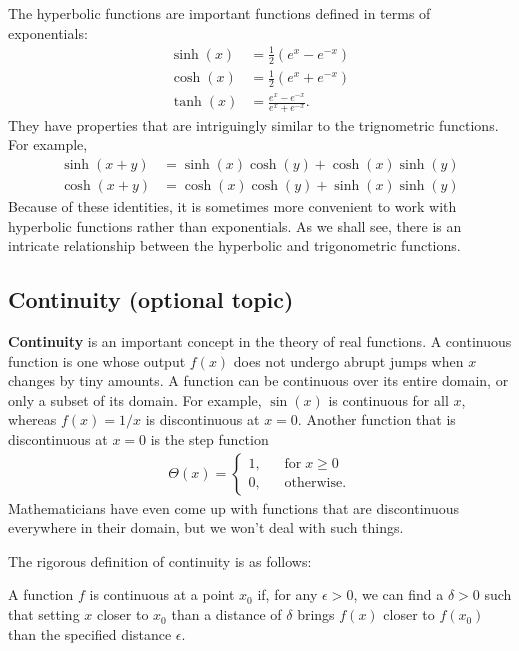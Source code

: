 \documentclass[10pt,a4paper]{article}
\begin{document}
The hyperbolic functions are important functions defined in terms of
exponentials:
\begin{align}
  \sinh(x) &= \frac{1}{2}\left(e^{x} - e^{-x}\right) \\
  \cosh(x) &= \frac{1}{2}\left(e^{x} + e^{-x}\right) \\
  \tanh(x) &= \frac{e^{x} - e^{-x}}{e^{x} + e^{-x}}.
\end{align}
They have properties that are intriguingly similar to the trignometric
functions. For example,
\begin{align}
  \sinh(x+y) &= \sinh(x)\cosh(y) + \cosh(x)\sinh(y) \\
  \cosh(x+y) &= \cosh(x)\cosh(y) + \sinh(x)\sinh(y)
\end{align}
Because of these identities, it is sometimes more convenient to work
with hyperbolic functions rather than exponentials. As we shall see,
there is an intricate relationship between the hyperbolic and
trigonometric functions.

\subsection{Continuity (optional topic)}

\textbf{Continuity} is an important concept in the theory of real
functions. A continuous function is one whose output $f(x)$ does not
undergo abrupt jumps when $x$ changes by tiny amounts.  A function can
be continuous over its entire domain, or only a subset of its
domain. For example, $\sin(x)$ is continuous for all $x$, whereas
$f(x) = 1/x$ is discontinuous at $x = 0$.  Another function that is
discontinuous at $x=0$ is the step function
\begin{align}
  \Theta(x) = \left\{\begin{array}{ll} 1, &\;\;\;\textrm{for} \; x \ge 0\\ 0,&\;\;\; \textrm{otherwise.}\end{array}\right.
\end{align}
Mathematicians have even come up with functions that are discontinuous
everywhere in their domain, but we won't deal with such things.

The rigorous definition of continuity is as follows:
\begin{framed}
\noindent
  A function $f$ is continuous at a point $x_0$ if, for any $\epsilon >
0$, we can find a $\delta > 0$ such that setting $x$ closer to $x_0$
than a distance of $\delta$ brings $f(x)$ closer to $f(x_0)$ than the
specified distance $\epsilon$.
\end{framed}
\end{document}
